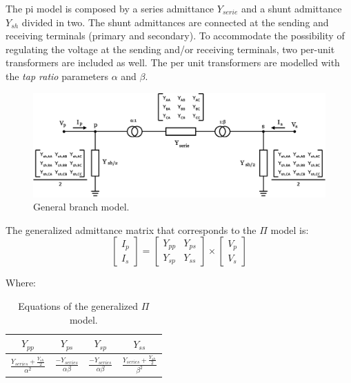 \documentclass[a4paper,twoside,fleqn]{tufte-book}
\begin{document}
The pi model is composed by a series admittance  $Y_{serie}$ and a shunt admittance $Y_{sh}$ divided in two. The shunt admittances are connected at the sending and receiving terminals (primary and secondary). To accommodate the possibility of regulating the voltage at the sending and/or receiving terminals, two per-unit transformers are included as well. The per unit transformers are modelled with the \textit{tap ratio} parameters $\alpha$ and $\beta$.


\begin{center}
	\begin{figure}[h]
		\includegraphics[width=0.6\linewidth]{img/Branch.eps}
		\caption{General branch model.}
		\label{pi_model}
	\end{figure}
\end{center}

The generalized admittance matrix that corresponds to the $\Pi$ model is:
\begin{equation}
\left[\begin{array}{c}
I_p \\
I_s
\end{array}\right] = \left[\begin{array}{cc}
Y_{pp} & Y_{ps} \\
Y_{sp} & Y_{ss}
\end{array}\right] \times \left[\begin{array}{c}
V_p \\
V_s
\end{array}\right]
\label{pi_main_formula}
\end{equation}

Where:

\begin{table}[h!]
\begin{center}
\begin{tabular}{cccc}
\toprule

$Y_{pp}$ &  $Y_{ps}$ & $Y_{sp}$ & $Y_{ss}$\\

\midrule

$\frac{Y_{series} + \frac{Y_{sh}}{2}}{\alpha^2}$ &  $\frac{-Y_{series}}{\alpha\beta}$ & $\frac{-Y_{series}}{\alpha\beta}$ & $\frac{Y_{series} + \frac{Y_{sh}}{2}}{\beta^2}$\\

\bottomrule
\end{tabular}
\end{center}
  \caption{Equations of the generalized $\Pi$ model.}
  \label{pi_model_equations}
\end{table}
\end{document}

